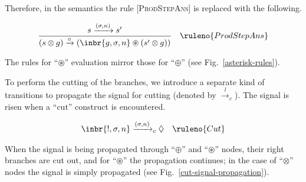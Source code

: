 Therefore, in the semantics the rule \textsc{[ProdStepAns]} is replaced with the following.

\[
\begin{array}{cr}
  \dfrac{s \xrightarrow{(\sigma, n)} s'}{(s \otimes g) \xrightarrow{\circ} (\inbr{g, \sigma, n} \circledast (s' \otimes g))} & \ruleno{ProdStepAns} 
\end{array}
\]
\vskip3mm

The rules for ``$\circledast$'' evaluation mirror those for ``$\oplus$'' (see Fig.~\ref{asterisk-rules}).

To perform the cutting of the branches, we introduce a separate kind of transitions to propagate the signal for cutting (denoted by $\xrightarrow{l}_c$). The signal is risen when a ``cut'' construct is encountered.

\[
\begin{array}{cr}
  \inbr{!, \sigma, n} \xrightarrow{(\sigma, n)}_c \Diamond &\ruleno{Cut} 
\end{array}
\]
\vskip3mm

When the signal is being propagated through ``$\oplus$'' and ``$\circledast$'' nodes, their right branches are cut out, and for ``$\circledast$'' the
propagation continues; in the case of ``$\otimes$'' nodes the signal is simply propagated (see Fig.~\ref{cut-signal-propagation}).